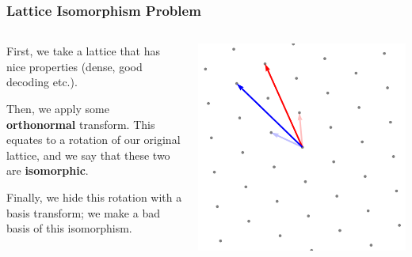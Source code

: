\documentclass[
aspectratio=169, %
t, %
onlytextwidth, %
10pt, %
]{beamer}
\begin{document}
\begin{frame}
    \frametitle{Lattice Isomorphism Problem}
    \begin{columns}[T]
        \begin{column}{0.48\linewidth}
            First, we take a lattice that has nice properties (dense, good decoding etc.).

            Then, we apply some \textbf{orthonormal} transform. This equates to a rotation of our original lattice, and we say that these two are \textbf{isomorphic}.

            Finally, we hide this rotation with a basis transform; we make a bad basis of this isomorphism.
        \end{column}
        \begin{column}{0.48\linewidth}
            \includegraphics[width=\linewidth]{a2_rotated_basis_change.png}
        \end{column}
    \end{columns}
\end{frame}

\end{document}

